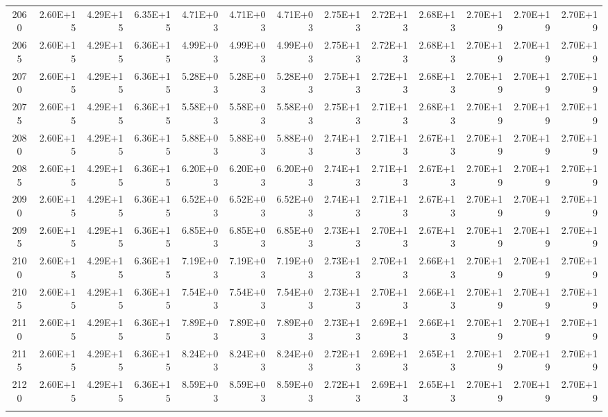 \documentclass{article}
\begin{document}
\begin{table}
\begin{tabular}{crrr|rrr|rrr|rrr}
2060     & 2.60E+15  & 4.29E+15  & 6.35E+15  & 4.71E+03  & 4.71E+03  & 4.71E+03  & 2.75E+13  & 2.72E+13  & 2.68E+13  & 2.70E+19  & 2.70E+19  & 2.70E+19  \\
2065     & 2.60E+15  & 4.29E+15  & 6.36E+15  & 4.99E+03  & 4.99E+03  & 4.99E+03  & 2.75E+13  & 2.72E+13  & 2.68E+13  & 2.70E+19  & 2.70E+19  & 2.70E+19  \\
2070     & 2.60E+15  & 4.29E+15  & 6.36E+15  & 5.28E+03  & 5.28E+03  & 5.28E+03  & 2.75E+13  & 2.72E+13  & 2.68E+13  & 2.70E+19  & 2.70E+19  & 2.70E+19  \\
2075     & 2.60E+15  & 4.29E+15  & 6.36E+15  & 5.58E+03  & 5.58E+03  & 5.58E+03  & 2.75E+13  & 2.71E+13  & 2.68E+13  & 2.70E+19  & 2.70E+19  & 2.70E+19  \\
2080     & 2.60E+15  & 4.29E+15  & 6.36E+15  & 5.88E+03  & 5.88E+03  & 5.88E+03  & 2.74E+13  & 2.71E+13  & 2.67E+13  & 2.70E+19  & 2.70E+19  & 2.70E+19  \\
2085     & 2.60E+15  & 4.29E+15  & 6.36E+15  & 6.20E+03  & 6.20E+03  & 6.20E+03  & 2.74E+13  & 2.71E+13  & 2.67E+13  & 2.70E+19  & 2.70E+19  & 2.70E+19  \\
2090     & 2.60E+15  & 4.29E+15  & 6.36E+15  & 6.52E+03  & 6.52E+03  & 6.52E+03  & 2.74E+13  & 2.71E+13  & 2.67E+13  & 2.70E+19  & 2.70E+19  & 2.70E+19  \\
2095     & 2.60E+15  & 4.29E+15  & 6.36E+15  & 6.85E+03  & 6.85E+03  & 6.85E+03  & 2.73E+13  & 2.70E+13  & 2.67E+13  & 2.70E+19  & 2.70E+19  & 2.70E+19  \\
2100     & 2.60E+15  & 4.29E+15  & 6.36E+15  & 7.19E+03  & 7.19E+03  & 7.19E+03  & 2.73E+13  & 2.70E+13  & 2.66E+13  & 2.70E+19  & 2.70E+19  & 2.70E+19  \\
2105     & 2.60E+15  & 4.29E+15  & 6.36E+15  & 7.54E+03  & 7.54E+03  & 7.54E+03  & 2.73E+13  & 2.70E+13  & 2.66E+13  & 2.70E+19  & 2.70E+19  & 2.70E+19  \\
2110     & 2.60E+15  & 4.29E+15  & 6.36E+15  & 7.89E+03  & 7.89E+03  & 7.89E+03  & 2.73E+13  & 2.69E+13  & 2.66E+13  & 2.70E+19  & 2.70E+19  & 2.70E+19  \\
2115     & 2.60E+15  & 4.29E+15  & 6.36E+15  & 8.24E+03  & 8.24E+03  & 8.24E+03  & 2.72E+13  & 2.69E+13  & 2.65E+13  & 2.70E+19  & 2.70E+19  & 2.70E+19  \\
2120     & 2.60E+15  & 4.29E+15  & 6.36E+15  & 8.59E+03  & 8.59E+03  & 8.59E+03  & 2.72E+13  & 2.69E+13  & 2.65E+13  & 2.70E+19  & 2.70E+19  & 2.70E+19  \\
         &           &           &           &           &           &           &           &           &           &           &           &           \\ \hline

\end{tabular}
\end{table}
\end{document}
